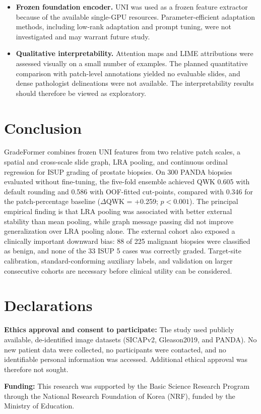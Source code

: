 \documentclass[11pt,a4paper]{article}
\begin{document}
\begin{itemize}[leftmargin=1.8em, itemsep=3pt, parsep=0pt]
  \item \textbf{Frozen foundation encoder.} UNI was used as a frozen feature extractor because of the available single-GPU resources. Parameter-efficient adaptation methods, including low-rank adaptation and prompt tuning, were not investigated and may warrant future study.
  \item \textbf{Qualitative interpretability.} Attention maps and LIME attributions were assessed visually on a small number of examples. The planned quantitative comparison with patch-level annotations yielded no evaluable slides, and dense pathologist delineations were not available. The interpretability results should therefore be viewed as exploratory.
\end{itemize}


\section{Conclusion}
GradeFormer combines frozen UNI features from two relative patch scales, a spatial and cross-scale slide graph, LRA pooling, and continuous ordinal regression for ISUP grading of prostate biopsies. On 300 PANDA biopsies evaluated without fine-tuning, the five-fold ensemble achieved QWK 0.605 with default rounding and 0.586 with OOF-fitted cut-points, compared with 0.346 for the patch-percentage baseline ($\Delta$QWK = +0.259; $p < 0.001$). The principal empirical finding is that LRA pooling was associated with better external stability than mean pooling, while graph message passing did not improve generalization over LRA pooling alone. The external cohort also exposed a clinically important downward bias: 88 of 225 malignant biopsies were classified as benign, and none of the 33 ISUP 5 cases was correctly graded. Target-site calibration, standard-conforming auxiliary labels, and validation on larger consecutive cohorts are necessary before clinical utility can be considered.


\section*{Declarations}
\textbf{Ethics approval and consent to participate:} The study used publicly available, de-identified image datasets (SICAPv2, Gleason2019, and PANDA). No new patient data were collected, no participants were contacted, and no identifiable personal information was accessed. Additional ethical approval was therefore not sought.

\textbf{Funding:} This research was supported by the Basic Science Research Program through the National Research Foundation of Korea (NRF), funded by the Ministry of Education.
\end{document}

